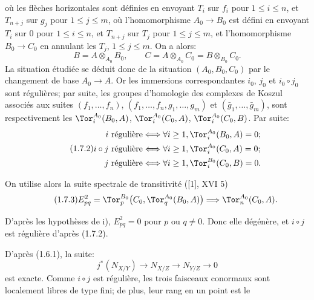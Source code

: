 où les
flèches horizontales sont définies en envoyant $T_i$ sur $f_i$ pour $1\leq i\leq n$, et $T_{n+j}$ sur $g_j$ pour $1\leq j\leq m$, où l'homomorphisme $A_0\longrightarrow B_0$ est défini en envoyant $T_i$ sur $0$ pour $1\leq i\leq n$, et $T_{n+j}$ sur $T_j$ pour $1\leq j\leq m$, et l'homomorphisme $B_0\longrightarrow C_0$ en annulant les $T_j$, $1\leq j\leq m$. On a alors:
\[
 B=A\otimes_{A_0}B_0,
 \qquad
 C=A\otimes_{A_0}C_0=B\otimes_{B_0}C_0.
\]
La situation étudiée se déduit donc de la situation $(A_0,B_0,C_0)$ par le changement de base $A_0\longrightarrow A$. Or les immersions correspondantes $i_0$, $j_0$ et $i_0\circ j_0$ sont régulières; par suite, les groupes d'homologie des complexes de Koszul associés aux suites $(f_1,\ldots,f_n)$, $(f_1,\ldots,f_n,g_1,\ldots,g_m)$ et $(\bar g_1,\ldots,\bar g_m)$, sont respectivement les $\Tor_i^{A_0}(B_0,A)$, $\Tor_i^{A_0}(C_0,A)$, $\Tor_i^{A_0}(C_0,B)$. Par suite:
\begin{equation}\tag{1.7.2}
\begin{aligned}
 i\ \text{régulière} &\Longleftrightarrow \forall i\geq1,
 \Tor_i^{A_0}(B_0,A)=0;\\
 i\circ j\ \text{régulière} &\Longleftrightarrow \forall i\geq1,
 \Tor_i^{A_0}(C_0,A)=0;\\
 j\ \text{régulière} &\Longleftrightarrow \forall i\geq1,
 \Tor_i^{B_0}(C_0,B)=0.
\end{aligned}
\end{equation}

On utilise alors la suite spectrale de transitivité ([1], XVI 5)
\begin{equation}\tag{1.7.3}
E^2_{pq}=\Tor_p^{B_0}\bigl(C_0,\Tor_q^{A_0}(B_0,A)\bigr)
\Longrightarrow \Tor_n^{A_0}(C_0,A).
\end{equation}

D'après les hypothèses de i), $E^2_{pq}=0$ pour $p$ ou $q\ne0$. Donc elle dégénère, et $i\circ j$ est régulière d'après (1.7.2).

D'après (1.6.1), la suite:
\[
 j^*(N_{X/Y})\longrightarrow N_{X/Z}\longrightarrow N_{Y/Z}\longrightarrow0
\]
est exacte. Comme $i\circ j$ est régulière, les trois faisceaux conormaux sont localement libres de type fini; de plus, leur rang en un point est le
